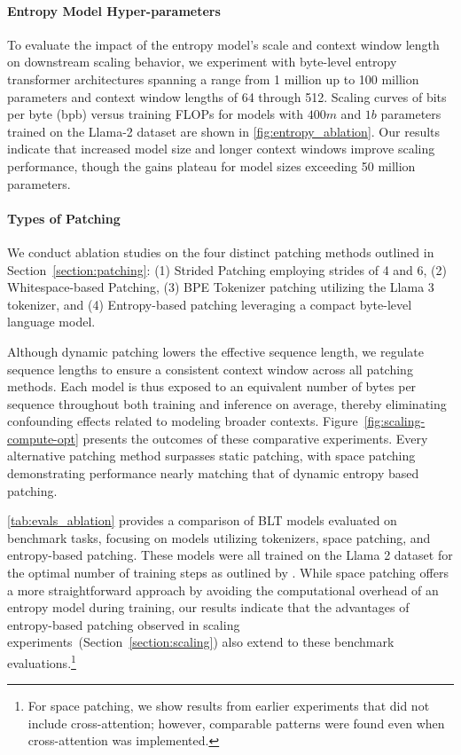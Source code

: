 \paragraph{Entropy Model Hyper-parameters} To evaluate the impact of the entropy model’s scale and context window length on downstream scaling behavior, we experiment with byte-level entropy transformer architectures spanning a range from 1 million up to 100 million parameters and context window lengths of 64 through 512. Scaling curves of bits per byte (bpb) versus training FLOPs for models with $400m$ and $1b$ parameters trained on the Llama-2 dataset are shown in \autoref{fig:entropy_ablation}. Our results indicate that increased model size and longer context windows improve scaling performance, though the gains plateau for model sizes exceeding 50 million parameters.

\paragraph{Types of Patching}

We conduct ablation studies on the four distinct patching methods outlined in Section~\ref{section:patching}: (1) Strided Patching employing strides of 4 and 6, (2) Whitespace-based Patching, (3) BPE Tokenizer patching utilizing the Llama 3 tokenizer, and (4) Entropy-based patching leveraging a compact byte-level language model.

Although dynamic patching lowers the effective sequence length, we regulate sequence lengths to ensure a consistent context window across all patching methods. Each model is thus exposed to an equivalent number of bytes per sequence throughout both training and inference on average, thereby eliminating confounding effects related to modeling broader contexts. Figure~\ref{fig:scaling-compute-opt} presents the outcomes of these comparative experiments. Every alternative patching method surpasses static patching, with space patching demonstrating performance nearly matching that of dynamic entropy based patching.

\autoref{tab:evals_ablation} provides a comparison of {\textsc BLT} models evaluated on benchmark tasks, focusing on models utilizing tokenizers, space patching, and entropy-based patching. These models were all trained on the Llama 2 dataset for the optimal number of training steps as outlined by \citet{dubey2024llama}. While space patching offers a more straightforward approach by avoiding the computational overhead of an entropy model during training, our results indicate that the advantages of entropy-based patching observed in scaling experiments~(Section~\ref{section:scaling}) also extend to these benchmark evaluations.\footnote{For space patching, we show results from earlier experiments that did not include cross-attention; however, comparable patterns were found even when cross-attention was implemented.}


